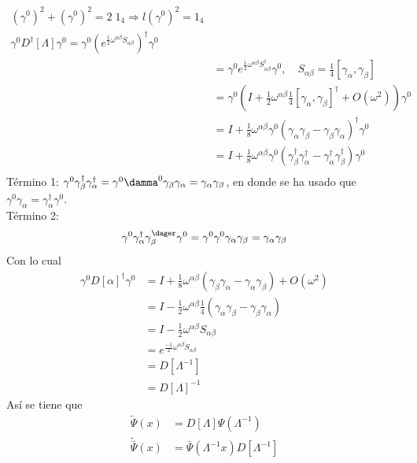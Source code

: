 \documentclass[../main.tex]{subfiles}
\begin{document}
\begin{align*}
  \left( \gamma^0 \right)^2 + \left( \gamma^0 \right)^2 = 2 \; 1_4 \Rightarrow l(\gamma^0)^2 = 1_4 \\
  \gamma^0 D^\dagger[\Lambda] \gamma^0 = \gamma^0 \left( e^{\frac{1}{2}\omega^{\alpha \beta}S_{\alpha \beta}} \right)^\dagger \gamma^0 \\
  & = \gamma^0 e^{\frac{1}{2}\omega^{\alpha \beta}S_{\alpha\beta}^\dagger} \gamma^0, \quad S_{\alpha\beta} = \frac{1}{4}[\gamma_\alpha , \gamma_\beta] \\
  & = \gamma^0 \left( I + \frac{1}{2}\omega^{\alpha\beta} \frac{1}{4} [\gamma_\alpha , \gamma_\beta]^\dagger + O(\omega^2) \right)\gamma^0 \\
  & = I + \frac{1}{8} \omega^{\alpha \beta}\gamma^0  \left( \gamma_\alpha \gamma_\beta - \gamma_\beta \gamma_\alpha \right)^\dagger \gamma^0 \\
  & = I + \frac{1}{8} \omega^{\alpha\beta} \gamma^0 \left( \gamma_\beta^\dagger \gamma_\alpha^\dagger - \gamma_\alpha^\dagger \gamma_\beta^\dagger \right)\gamma^0 \\
\end{align*}
Término 1: $\gamma^0 \gamma^\dagger_\beta \gamma_\alpha^\dagger = \gamma^0 \damma^0 \gamma_\beta \gamma_\alpha = \gamma_\alpha \gamma_\beta$, en donde se ha usado que $\gamma^0 \gamma_\alpha = \gamma^\dagger_\alpha \gamma^0$. \\
Término 2: 
\begin{align*}
  \gamma^0 \gamma^\dagger_\alpha \gamma^\dager_\beta \gamma^0  = \gamma^0 \gamma^0 \gamma_\alpha \gamma_\beta = \gamma_\alpha \gamma_\beta
\end{align*}
Con lo cual
\begin{align*}
  \gamma^0 D[\alpha]^\dagger \gamma^0 & = I + \frac{1}{8}\omega^{\alpha \beta} \left( \gamma_\beta \gamma_\alpha - \gamma_\alpha \gamma_\beta \right) + O(\omega^2) \\
  & = I - \frac{1}{2} \omega^{\alpha \beta} \frac{1}{4} \left( \gamma_\alpha \gamma_\beta - \gamma_\beta \gamma_\alpha \right)  \\\
  & = I - \frac{1}{2}\omega^{\alpha \beta}S_{\alpha \beta} \\
  & = e^{\frac{-1}{2}\omega^{\alpha \beta}S_{\alpha \beta}} \\
  & = D[\Lambda^{-1}] \\
  & = D[\Lambda]^{-1}
\end{align*}
Así se tiene que
\begin{align}
  \tilde{\Psi}(x) &= D[\Lambda] \Psi(\Lambda^{-1}) \\
  \tilde{\bar{\Psi}} (x) &  = \bar{\Psi}(\Lambda^{-1}x)D[\Lambda^{-1}]
\end{align}
\end{document}
